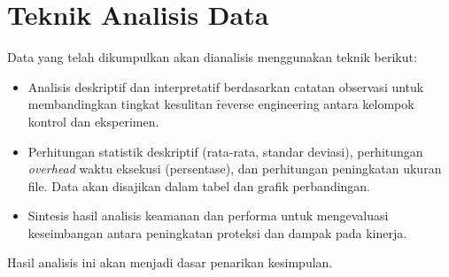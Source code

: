 \section{Teknik Analisis Data}
Data yang telah dikumpulkan akan dianalisis menggunakan teknik berikut:
\begin{itemize}
    \item {} Analisis deskriptif dan interpretatif berdasarkan catatan observasi untuk membandingkan tingkat kesulitan \f{reverse engineering} antara kelompok kontrol dan eksperimen.
    \item {} Perhitungan statistik deskriptif (rata-rata, standar deviasi), perhitungan \textit{overhead} waktu eksekusi (persentase), dan perhitungan peningkatan ukuran file. Data akan disajikan dalam tabel dan grafik perbandingan.
    \item {} Sintesis hasil analisis keamanan dan performa untuk mengevaluasi keseimbangan antara peningkatan proteksi dan dampak pada kinerja.
\end{itemize}
Hasil analisis ini akan menjadi dasar penarikan kesimpulan.

